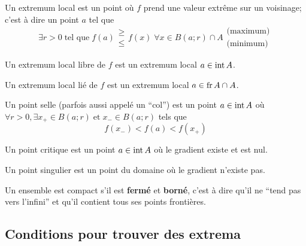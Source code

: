 \begin{mydef} Un extremum local est un point où $f$ prend une valeur extrême sur un voisinage; c'est à dire un point $a$ tel que
	\[ \exists r >0 \; \text{tel que} \; f(a) \begin{array}{l} \geq \\ \leq \end{array} f(x) \; \forall x \in B(a;r) \cap A \begin{array}{l} \text{(maximum)} \\ \text{(minimum)}
	\end{array} \]
\end{mydef}

\begin{mydef}
	Un extremum local libre de $f$ est un extremum local $a \in \operatorname{int} A$.
\end{mydef}

\begin{mydef}
	Un extremum local lié de $f$ est un extremum local $a \in \operatorname{fr} A \cap A$.
\end{mydef}

\begin{mydef}
	Un point selle (parfois aussi appelé un ``col'') est un point $a \in \operatorname{int} A$ où $\forall r > 0, \exists x_+ \in B(a;r) \; \text{et} \; x_- \in B(a;r)$ tels que
	\[ f(x_-) < f(a) < f(x_+) \]
\end{mydef}

\begin{mydef}
	Un point critique est un point $a \in \operatorname{int} A$ où le gradient existe et est nul.
\end{mydef}

\begin{mydef}
	Un point singulier est un point du domaine où le gradient n'existe pas.
\end{mydef}

\begin{mydef}
	Un  ensemble est compact s'il est \textbf{fermé} et \textbf{borné},
	c'est à dire qu'il ne ``tend pas vers l'infini'' et qu'il contient tous ses points frontières.
\end{mydef}

\subsection{Conditions pour trouver des extrema}

